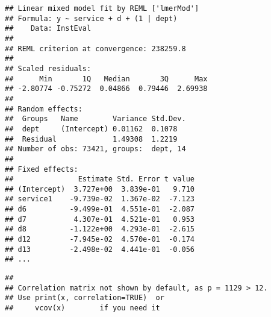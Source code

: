 \documentclass[
]{article}
\begin{document}
\begin{verbatim}
## Linear mixed model fit by REML ['lmerMod']
## Formula: y ~ service + d + (1 | dept)
##    Data: InstEval
## 
## REML criterion at convergence: 238259.8
## 
## Scaled residuals: 
##      Min       1Q   Median       3Q      Max 
## -2.80774 -0.75272  0.04866  0.79446  2.69938 
## 
## Random effects:
##  Groups   Name        Variance Std.Dev.
##  dept     (Intercept) 0.01162  0.1078  
##  Residual             1.49308  1.2219  
## Number of obs: 73421, groups:  dept, 14
## 
## Fixed effects:
##               Estimate Std. Error t value
## (Intercept)  3.727e+00  3.839e-01   9.710
## service1    -9.739e-02  1.367e-02  -7.123
## d6          -9.499e-01  4.551e-01  -2.087
## d7           4.307e-01  4.521e-01   0.953
## d8          -1.122e+00  4.293e-01  -2.615
## d12         -7.945e-02  4.570e-01  -0.174
## d13         -2.498e-02  4.441e-01  -0.056
## ...
\end{verbatim}

\begin{verbatim}
## 
## Correlation matrix not shown by default, as p = 1129 > 12.
## Use print(x, correlation=TRUE)  or
##     vcov(x)        if you need it
\end{verbatim}
\end{document}

